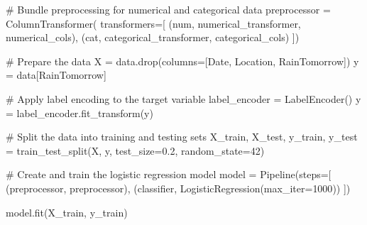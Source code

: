 \documentclass[
  letterpaper,
  DIV=11,
  numbers=noendperiod]{scrartcl}
\newenvironment{Shaded}{\begin{snugshade}}{\end{snugshade}}
\newcommand{\CommentTok}[1]{\textcolor[rgb]{0.37,0.37,0.37}{#1}}
\newcommand{\DecValTok}[1]{\textcolor[rgb]{0.68,0.00,0.00}{#1}}
\newcommand{\FloatTok}[1]{\textcolor[rgb]{0.68,0.00,0.00}{#1}}
\newcommand{\NormalTok}[1]{\textcolor[rgb]{0.00,0.23,0.31}{#1}}
\newcommand{\OperatorTok}[1]{\textcolor[rgb]{0.37,0.37,0.37}{#1}}
\newcommand{\StringTok}[1]{\textcolor[rgb]{0.13,0.47,0.30}{#1}}
\begin{document}
\begin{Shaded}
\begin{Highlighting}[]
\CommentTok{\# Bundle preprocessing for numerical and categorical data}
\NormalTok{preprocessor }\OperatorTok{=}\NormalTok{ ColumnTransformer(}
\NormalTok{    transformers}\OperatorTok{=}\NormalTok{[}
\NormalTok{        (}\StringTok{\textquotesingle{}num\textquotesingle{}}\NormalTok{, numerical\_transformer, numerical\_cols),}
\NormalTok{        (}\StringTok{\textquotesingle{}cat\textquotesingle{}}\NormalTok{, categorical\_transformer, categorical\_cols)}
\NormalTok{    ])}

\CommentTok{\# Prepare the data}
\NormalTok{X }\OperatorTok{=}\NormalTok{ data.drop(columns}\OperatorTok{=}\NormalTok{[}\StringTok{\textquotesingle{}Date\textquotesingle{}}\NormalTok{, }\StringTok{\textquotesingle{}Location\textquotesingle{}}\NormalTok{, }\StringTok{\textquotesingle{}RainTomorrow\textquotesingle{}}\NormalTok{])}
\NormalTok{y }\OperatorTok{=}\NormalTok{ data[}\StringTok{\textquotesingle{}RainTomorrow\textquotesingle{}}\NormalTok{]}

\CommentTok{\# Apply label encoding to the target variable}
\NormalTok{label\_encoder }\OperatorTok{=}\NormalTok{ LabelEncoder()}
\NormalTok{y }\OperatorTok{=}\NormalTok{ label\_encoder.fit\_transform(y)}

\CommentTok{\# Split the data into training and testing sets}
\NormalTok{X\_train, X\_test, y\_train, y\_test }\OperatorTok{=}\NormalTok{ train\_test\_split(X, y, test\_size}\OperatorTok{=}\FloatTok{0.2}\NormalTok{, random\_state}\OperatorTok{=}\DecValTok{42}\NormalTok{)}

\CommentTok{\# Create and train the logistic regression model}
\NormalTok{model }\OperatorTok{=}\NormalTok{ Pipeline(steps}\OperatorTok{=}\NormalTok{[}
\NormalTok{    (}\StringTok{\textquotesingle{}preprocessor\textquotesingle{}}\NormalTok{, preprocessor),}
\NormalTok{    (}\StringTok{\textquotesingle{}classifier\textquotesingle{}}\NormalTok{, LogisticRegression(max\_iter}\OperatorTok{=}\DecValTok{1000}\NormalTok{))}
\NormalTok{])}

\NormalTok{model.fit(X\_train, y\_train)}
\end{Highlighting}
\end{Shaded}
\end{document}
